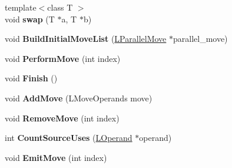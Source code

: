 \begin{DoxyCompactItemize}
\item 
{\footnotesize template$<$class T $>$ }\\void {\bfseries swap} (T $\ast$a, T $\ast$b)\hypertarget{classv8_1_1internal_1_1_b_a_s_e___e_m_b_e_d_d_e_d_ac5c46f37ea9c0c6e73e6a90bf5e51221}{}\label{classv8_1_1internal_1_1_b_a_s_e___e_m_b_e_d_d_e_d_ac5c46f37ea9c0c6e73e6a90bf5e51221}

\item 
void {\bfseries Build\+Initial\+Move\+List} (\hyperlink{classv8_1_1internal_1_1_l_parallel_move}{L\+Parallel\+Move} $\ast$parallel\+\_\+move)\hypertarget{classv8_1_1internal_1_1_b_a_s_e___e_m_b_e_d_d_e_d_a18e46b4919bd34c5ff192a955f86238d}{}\label{classv8_1_1internal_1_1_b_a_s_e___e_m_b_e_d_d_e_d_a18e46b4919bd34c5ff192a955f86238d}

\item 
void {\bfseries Perform\+Move} (int index)\hypertarget{classv8_1_1internal_1_1_b_a_s_e___e_m_b_e_d_d_e_d_a01fea4beaf81ccc3a326c14fdda8a2aa}{}\label{classv8_1_1internal_1_1_b_a_s_e___e_m_b_e_d_d_e_d_a01fea4beaf81ccc3a326c14fdda8a2aa}

\item 
void {\bfseries Finish} ()\hypertarget{classv8_1_1internal_1_1_b_a_s_e___e_m_b_e_d_d_e_d_ab548eea67f623b5c744d4cde85093de7}{}\label{classv8_1_1internal_1_1_b_a_s_e___e_m_b_e_d_d_e_d_ab548eea67f623b5c744d4cde85093de7}

\item 
void {\bfseries Add\+Move} (L\+Move\+Operands move)\hypertarget{classv8_1_1internal_1_1_b_a_s_e___e_m_b_e_d_d_e_d_a2abe82153c72385671db639992f13517}{}\label{classv8_1_1internal_1_1_b_a_s_e___e_m_b_e_d_d_e_d_a2abe82153c72385671db639992f13517}

\item 
void {\bfseries Remove\+Move} (int index)\hypertarget{classv8_1_1internal_1_1_b_a_s_e___e_m_b_e_d_d_e_d_a968e26caddd16f79466b3910de1fe216}{}\label{classv8_1_1internal_1_1_b_a_s_e___e_m_b_e_d_d_e_d_a968e26caddd16f79466b3910de1fe216}

\item 
int {\bfseries Count\+Source\+Uses} (\hyperlink{classv8_1_1internal_1_1_l_operand}{L\+Operand} $\ast$operand)\hypertarget{classv8_1_1internal_1_1_b_a_s_e___e_m_b_e_d_d_e_d_a6e49b61d01fea9e844dd9d991ce93d0a}{}\label{classv8_1_1internal_1_1_b_a_s_e___e_m_b_e_d_d_e_d_a6e49b61d01fea9e844dd9d991ce93d0a}

\item 
void {\bfseries Emit\+Move} (int index)\hypertarget{classv8_1_1internal_1_1_b_a_s_e___e_m_b_e_d_d_e_d_a50988d2a86b49713575ec93e3c922dcf}{}\label{classv8_1_1internal_1_1_b_a_s_e___e_m_b_e_d_d_e_d_a50988d2a86b49713575ec93e3c922dcf}


\end{DoxyCompactItemize}
